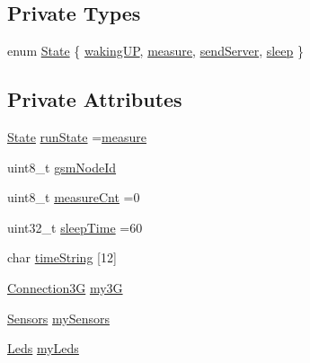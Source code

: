 \subsection*{Private Types}
\begin{DoxyCompactItemize}
\item 
enum \hyperlink{class_sensor_stab___g_s_m_ab54acd7d71dead330c45e0a63eb57bb1}{State} \{ \hyperlink{class_sensor_stab___g_s_m_ab54acd7d71dead330c45e0a63eb57bb1a10b0dd2034108d68808ec3d6510a88a9}{waking\+UP}, 
\hyperlink{class_sensor_stab___g_s_m_ab54acd7d71dead330c45e0a63eb57bb1a17d82b0bc837edbad765bdbd9f8cf688}{measure}, 
\hyperlink{class_sensor_stab___g_s_m_ab54acd7d71dead330c45e0a63eb57bb1a6cd202057f69bbd6442e18ebebe66dfb}{send\+Server}, 
\hyperlink{class_sensor_stab___g_s_m_ab54acd7d71dead330c45e0a63eb57bb1a4564c3708d79e8d63c9c0922bc58ee3f}{sleep}
 \}
\end{DoxyCompactItemize}
\subsection*{Private Attributes}
\begin{DoxyCompactItemize}
\item 
\hyperlink{class_sensor_stab___g_s_m_ab54acd7d71dead330c45e0a63eb57bb1}{State} \hyperlink{class_sensor_stab___g_s_m_a413ed86e48c8640f40304d0230a034b0}{run\+State} =\hyperlink{class_sensor_stab___g_s_m_ab54acd7d71dead330c45e0a63eb57bb1a17d82b0bc837edbad765bdbd9f8cf688}{measure}
\item 
uint8\+\_\+t \hyperlink{class_sensor_stab___g_s_m_aab1282700ef9e76f861a811e0b06c9f6}{gsm\+Node\+Id}
\item 
uint8\+\_\+t \hyperlink{class_sensor_stab___g_s_m_ab3626e426569a7b2d32f9a74233d2706}{measure\+Cnt} =0
\item 
uint32\+\_\+t \hyperlink{class_sensor_stab___g_s_m_a2d2198862b030d374a21bfd9fc64807f}{sleep\+Time} =60
\item 
char \hyperlink{class_sensor_stab___g_s_m_a26b89fe7f887da9667ca9045a81f6899}{time\+String} \mbox{[}12\mbox{]}
\item 
\hyperlink{class_connection3_g}{Connection3G} \hyperlink{class_sensor_stab___g_s_m_a9f1e14e998706c0c4af29c3a967ebea1}{my3G}
\item 
\hyperlink{class_sensors}{Sensors} \hyperlink{class_sensor_stab___g_s_m_a440a3e3b518ae7a139f7edf0e2cef237}{my\+Sensors}
\item 
\hyperlink{class_leds}{Leds} \hyperlink{class_sensor_stab___g_s_m_a218084ad1259d098fc89c7532c1aa411}{my\+Leds}
\end{DoxyCompactItemize}


